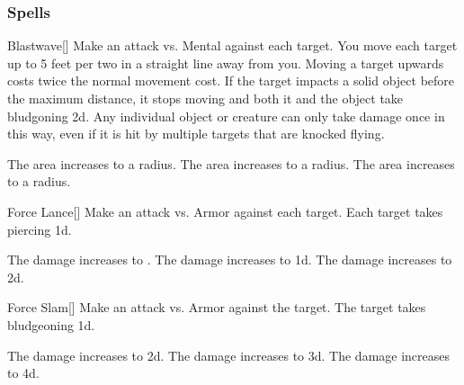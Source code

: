 \subsubsection{Spells}


\lowercase{\hypertarget{spell:Blastwave}{}}\label{spell:Blastwave}
\begin{freeability}[Rank 1]{\hypertarget{spell:Blastwave}{Blastwave}}[]
Make an attack vs. Mental against each target.
\hit You move each target up to 5 feet per two  in a straight line away from you.
Moving a target upwards costs twice the normal movement cost.
If the target impacts a solid object before the maximum distance, it stops moving and both it and the object take bludgoning  \minus2d.
Any individual object or creature can only take damage once in this way, even if it is hit by multiple targets that are knocked flying.

\rankline
{} The area increases to a \areamed radius.
 The area increases to a \arealarge radius.
 The area increases to a \areahuge radius.
\end{freeability}
\vspace{0.25em}



\lowercase{\hypertarget{spell:Force Lance}{}}\label{spell:Force Lance}
\begin{freeability}[Rank 1]{\hypertarget{spell:Force Lance}{Force Lance}}[]
Make an attack vs. Armor against each target.
\hit Each target takes piercing  \minus1d.

\rankline
{} The damage increases to .
 The damage increases to  \plus1d.
 The damage increases to  \plus2d.
\end{freeability}
\vspace{0.25em}



\lowercase{\hypertarget{spell:Force Slam}{}}\label{spell:Force Slam}
\begin{freeability}[Rank 1]{\hypertarget{spell:Force Slam}{Force Slam}}[]
Make an attack vs. Armor against the target.
\hit The target takes bludgeoning  \plus1d.

\rankline
{} The damage increases to  \plus2d.
 The damage increases to  \plus3d.
 The damage increases to  \plus4d.
\end{freeability}
\vspace{0.25em}



